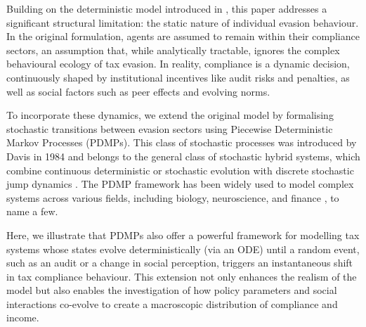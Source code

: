 \documentclass[11pt]{article}
\theoremstyle{plain}
\theoremstyle{definition}
\newcommand{\1}{\mathbf{1}}
\begin{document}
Building on the deterministic model introduced in \cite{bertotti2018mathematical}, this paper addresses a significant structural limitation: the static nature of individual evasion behaviour. In the original formulation, agents are assumed to remain within their compliance sectors, an assumption that, while analytically tractable, ignores the complex behavioural ecology of tax evasion. In reality, compliance is a dynamic decision, continuously shaped by institutional incentives like audit risks and penalties, as well as social factors such as peer effects and evolving norms.

To incorporate these dynamics, we extend the original model by formalising stochastic transitions between evasion sectors using Piecewise Deterministic Markov Processes (PDMPs). This class of stochastic processes was introduced by Davis in 1984 \cite{davis1984piecewise} and belongs to the general class of stochastic hybrid systems, which combine continuous deterministic or stochastic evolution with discrete stochastic jump dynamics \cite{blom1988piecewise, bujorianu2005toward, desmettre2025approximate, meddah2024stochastic}. The PDMP framework has been widely used to model complex systems across various fields, including biology, neuroscience, and finance \cite{buckwar2023stochastic, buckwar2011exact, buckwar2025american, desmettre2025hybrid}, to name a few.

Here, we illustrate that PDMPs also offer a powerful framework for modelling tax systems whose states evolve deterministically (via an ODE) until a random event, such as an audit or a change in social perception, triggers an instantaneous shift in tax compliance behaviour. This extension not only enhances the realism of the model but also enables the investigation of how policy parameters and social interactions co-evolve to create a macroscopic distribution of compliance and income.
\end{document}
